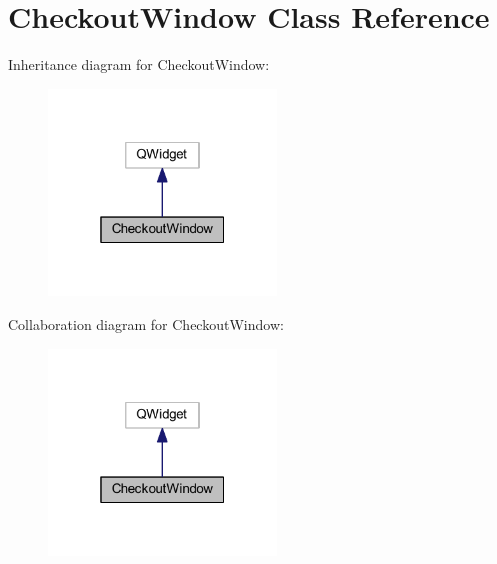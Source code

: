 \hypertarget{class_checkout_window}{}\section{Checkout\+Window Class Reference}
\label{class_checkout_window}


Inheritance diagram for Checkout\+Window\+:\nopagebreak
\begin{figure}[H]
\begin{center}
\leavevmode
\includegraphics[width=172pt]{class_checkout_window__inherit__graph}
\end{center}
\end{figure}


Collaboration diagram for Checkout\+Window\+:\nopagebreak
\begin{figure}[H]
\begin{center}
\leavevmode
\includegraphics[width=172pt]{class_checkout_window__coll__graph}
\end{center}
\end{figure}
